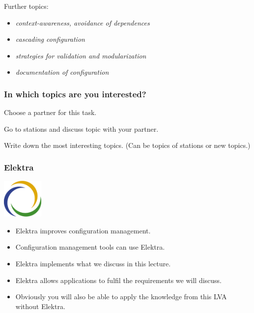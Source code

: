 \documentclass{beamer}
\begin{document}
\begin{frame}
	Further topics:
	\begin{itemize}
		\item \textit{context-awareness, avoidance of dependences}
		\item \textit{cascading configuration}
		\item \textit{strategies for validation and modularization}
		\item \textit{documentation of configuration}
	\end{itemize}
\end{frame}

\begin{assignment}
	\frametitle{In which topics are you interested?}
	\begin{task}[1]
	Choose a partner for this task.
	\end{task}

	\begin{task}[2]
	Go to stations and discuss topic with your partner.
	\end{task}

	\begin{task}[3]
	Write down the most interesting topics.
	(Can be topics of stations or new topics.)
	\end{task}
\end{assignment}

\begin{frame}
	\frametitle{Elektra}
	\hfill \includegraphics[width=2cm]{../figures/logo}
	\vspace{-1cm}
	\begin{itemize}
		\item Elektra improves configuration management.
		\item Configuration management tools can use Elektra.
		\item Elektra implements what we discuss in this lecture.
		\item Elektra allows applications to fulfil the requirements we will discuss.
		\item Obviously you will also be able to apply the knowledge from this LVA without Elektra.
	\end{itemize}
\end{frame}
\end{document}
